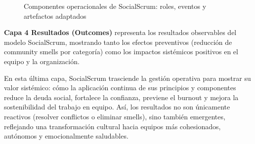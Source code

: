 \begin{figure}[htb]
    \caption{Componentes operacionales de SocialScrum: roles, eventos y artefactos adaptados}
    \label{fig:componentes_operacionales}
\end{figure}

\FloatBarrier

\textbf{Capa 4 Resultados (Outcomes)} representa los resultados observables del modelo SocialScrum, mostrando tanto los efectos preventivos (reducción de community smells por categoría) como los impactos sistémicos positivos en el equipo y la organización.

En esta última capa, SocialScrum trasciende la gestión operativa para mostrar su valor sistémico: cómo la aplicación continua de sus principios y componentes reduce la deuda social, fortalece la confianza, previene el burnout y mejora la sostenibilidad del trabajo en equipo.
Así, los resultados no son únicamente reactivos (resolver conflictos o eliminar smells), sino también emergentes, reflejando una transformación cultural hacia equipos más cohesionados, autónomos y emocionalmente saludables.


